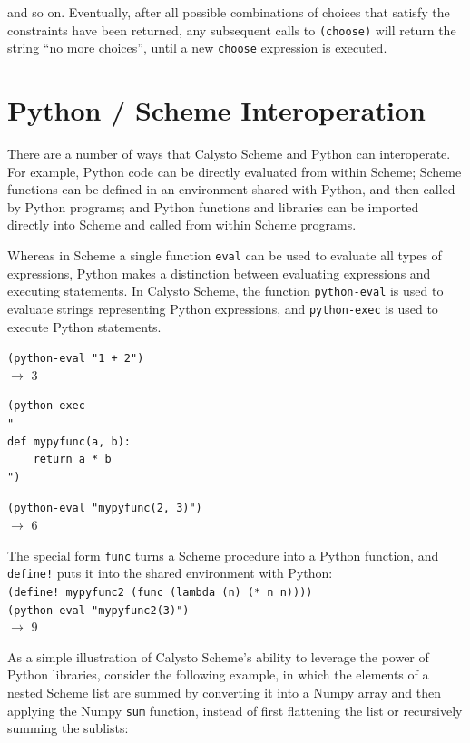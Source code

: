 \documentclass[acmsmall,screen,authorversion]{acmart}
\begin{document}
\noindent
and so on.  Eventually, after all possible combinations of choices that satisfy
the constraints have been returned, any subsequent calls to \texttt{(choose)}
will return the string ``no more choices'', until a new \texttt{choose}
expression is executed.

\section{Python / Scheme Interoperation}

There are a number of ways that Calysto Scheme and Python can interoperate. For
example, Python code can be directly evaluated from within Scheme; Scheme
functions can be defined in an environment shared with Python, and then called
by Python programs; and Python functions and libraries can be imported directly
into Scheme and called from within Scheme programs.

Whereas in Scheme a single function \texttt{eval} can be used to evaluate all
types of expressions, Python makes a distinction between evaluating expressions
and executing statements. In Calysto Scheme, the function \texttt{python-eval}
is used to evaluate strings representing Python expressions, and
\texttt{python-exec} is used to execute Python statements.\\

{\small
\noindent
\texttt{(python-eval "1 + 2")}\\
$\rightarrow$ 3

\noindent
\begin{verbatim}
(python-exec
"
def mypyfunc(a, b):
    return a * b
")
\end{verbatim}
\noindent\texttt{(python-eval "mypyfunc(2, 3)")}\\
$\rightarrow$ 6\\
}

\noindent
The special form \texttt{func} turns a Scheme procedure into a Python function,
and \texttt{define!} puts it into the shared environment with Python:\\

{\small
\noindent
\texttt{(define! mypyfunc2 (func (lambda (n) (* n n))))}\\
\texttt{(python-eval "mypyfunc2(3)")}\\
$\rightarrow$ 9\\
}

As a simple illustration of Calysto Scheme's ability to
leverage the power of Python libraries,
consider the following example, in which the elements of a nested Scheme list
are summed by converting it into a Numpy array and then applying the Numpy
\texttt{sum} function, instead of first flattening the list or recursively
summing the sublists:\\
\end{document}
